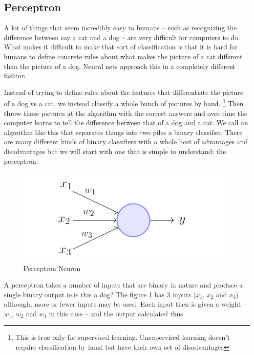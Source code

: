 \subsection{Perceptron}

A lot of things that seem incredibly easy to humans -- such as  recognizing the difference between say a cat and a dog -- are very difficult for computers to do.
What makes it difficult to make that sort of classification is that it is hard for humans to define concrete rules about what makes the picture of a cat different than the picture of a dog.
Neural nets approach this in a completely different fashion.

Instead of trying to define rules about the features that differentiate the picture of a dog vs a cat, we instead classify a whole bunch of pictures by hand.
\footnote{This is true only for supervised learning. Unsupervised learning doesn't require classification by hand but have their own set of disadvantages}
Then throw those pictures at the algorithm with the correct answers and over time the computer learns to tell the difference between that of a dog and a cat.
We call an algorithm like this that separates things into two piles a binary classifier.
There are many different kinds of binary classifiers with a whole host of advantages and disadvantages but we will start with one that is simple to understand; the perceptron.

\begin{figure}[H]
  \centering
  \includegraphics[width=120mm]{figures/perceptron1.png}
  \caption{Perceptron Neuron}
  \label{perceptron1}
\end{figure}

A perceptron takes a number of inputs that are binary in nature and produce a single binary output ie.is this a dog? The figure \ref{perceptron1} has 3 inputs ($x_1$, $x_2$ and $x_3$) although, more or fewer inputs may be used.
Each input then is given a weight -- $w_1$, $w_2$ and $w_3$ in this case -- and the output calculated thus.

